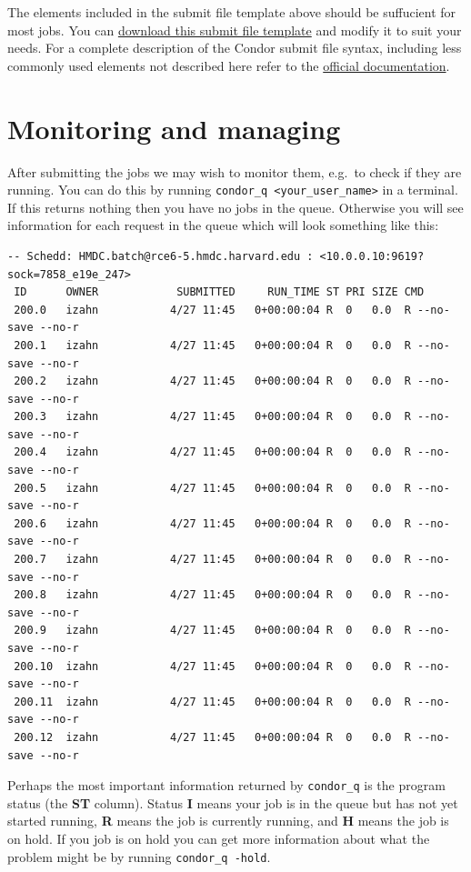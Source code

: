\documentclass[]{book}
\begin{document}
The elements included in the submit file template above should be
suffucient for most jobs. You can \href{template.submit}{download this
submit file template} and modify it to suit your needs. For a complete
description of the Condor submit file syntax, including less commonly
used elements not described here refer to the
\href{https://htcondor.readthedocs.io/en/v8_8_3/man-pages/condor_submit.html}{official
documentation}.

\section{Monitoring and managing}\label{monitoring-and-managing}

After submitting the jobs we may wish to monitor them, e.g.~to check if
they are running. You can do this by running
\texttt{condor\_q\ \textless{}your\_user\_name\textgreater{}} in a
terminal. If this returns nothing then you have no jobs in the queue.
Otherwise you will see information for each request in the queue which
will look something like this:

\begin{verbatim}
-- Schedd: HMDC.batch@rce6-5.hmdc.harvard.edu : <10.0.0.10:9619?sock=7858_e19e_247>
 ID      OWNER            SUBMITTED     RUN_TIME ST PRI SIZE CMD
 200.0   izahn           4/27 11:45   0+00:00:04 R  0   0.0  R --no-save --no-r
 200.1   izahn           4/27 11:45   0+00:00:04 R  0   0.0  R --no-save --no-r
 200.2   izahn           4/27 11:45   0+00:00:04 R  0   0.0  R --no-save --no-r
 200.3   izahn           4/27 11:45   0+00:00:04 R  0   0.0  R --no-save --no-r
 200.4   izahn           4/27 11:45   0+00:00:04 R  0   0.0  R --no-save --no-r
 200.5   izahn           4/27 11:45   0+00:00:04 R  0   0.0  R --no-save --no-r
 200.6   izahn           4/27 11:45   0+00:00:04 R  0   0.0  R --no-save --no-r
 200.7   izahn           4/27 11:45   0+00:00:04 R  0   0.0  R --no-save --no-r
 200.8   izahn           4/27 11:45   0+00:00:04 R  0   0.0  R --no-save --no-r
 200.9   izahn           4/27 11:45   0+00:00:04 R  0   0.0  R --no-save --no-r
 200.10  izahn           4/27 11:45   0+00:00:04 R  0   0.0  R --no-save --no-r
 200.11  izahn           4/27 11:45   0+00:00:04 R  0   0.0  R --no-save --no-r
 200.12  izahn           4/27 11:45   0+00:00:04 R  0   0.0  R --no-save --no-r
\end{verbatim}

Perhaps the most important information returned by \texttt{condor\_q} is
the program status (the \textbf{ST} column). Status \textbf{I} means
your job is in the queue but has not yet started running, \textbf{R}
means the job is currently running, and \textbf{H} means the job is on
hold. If you job is on hold you can get more information about what the
problem might be by running \texttt{condor\_q\ -hold}.
\end{document}

